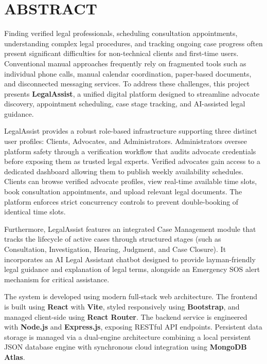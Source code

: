 \documentclass[12pt,a4paper]{report}
\begin{document}
\newpage
{}
\setcounter{page}{1}

\chapter*{ABSTRACT}

Finding verified legal professionals, scheduling consultation appointments, understanding complex legal procedures, and tracking ongoing case progress often present significant difficulties for non-technical clients and first-time users. Conventional manual approaches frequently rely on fragmented tools such as individual phone calls, manual calendar coordination, paper-based documents, and disconnected messaging services. To address these challenges, this project presents \textbf{LegalAssist}, a unified digital platform designed to streamline advocate discovery, appointment scheduling, case stage tracking, and AI-assisted legal guidance.

LegalAssist provides a robust role-based infrastructure supporting three distinct user profiles: Clients, Advocates, and Administrators. Administrators oversee platform safety through a verification workflow that audits advocate credentials before exposing them as trusted legal experts. Verified advocates gain access to a dedicated dashboard allowing them to publish weekly availability schedules. Clients can browse verified advocate profiles, view real-time available time slots, book consultation appointments, and upload relevant legal documents. The platform enforces strict concurrency controls to prevent double-booking of identical time slots.

Furthermore, LegalAssist features an integrated Case Management module that tracks the lifecycle of active cases through structured stages (such as Consultation, Investigation, Hearing, Judgment, and Case Closure). It incorporates an AI Legal Assistant chatbot designed to provide layman-friendly legal guidance and explanation of legal terms, alongside an Emergency SOS alert mechanism for critical assistance. 

The system is developed using modern full-stack web architecture. The frontend is built using \textbf{React} with \textbf{Vite}, styled responsively using \textbf{Bootstrap}, and managed client-side using \textbf{React Router}. The backend service is engineered with \textbf{Node.js} and \textbf{Express.js}, exposing RESTful API endpoints. Persistent data storage is managed via a dual-engine architecture combining a local persistent JSON database engine with synchronous cloud integration using \textbf{MongoDB Atlas}. 
\end{document}
